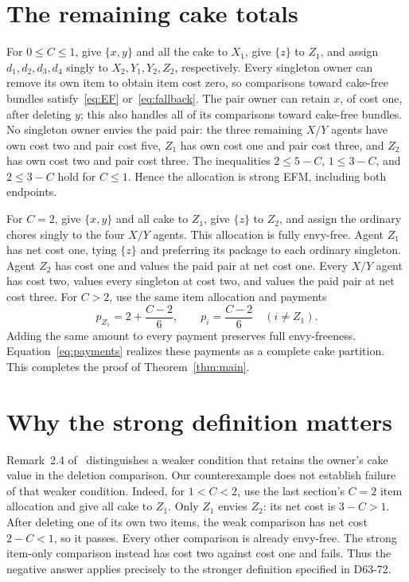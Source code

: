 \documentclass[11pt,a4paper]{article}
\begin{document}
\section{The remaining cake totals}

For $0\leq C\leq1$, give $\{x,y\}$ and all the cake to $X_1$, give
$\{z\}$ to $Z_1$, and assign $d_1,d_2,d_3,d_4$ singly to
$X_2,Y_1,Y_2,Z_2$, respectively. Every singleton owner can remove its
own item to obtain item cost zero, so comparisons toward cake-free
bundles satisfy~\eqref{eq:EF} or~\eqref{eq:fallback}.
The pair owner can retain $x$, of cost one, after deleting $y$;
this also handles all of its comparisons toward cake-free bundles.
No singleton owner envies the paid pair: the three remaining $X/Y$
agents have own cost two and pair cost five, $Z_1$ has own cost one
and pair cost three, and $Z_2$ has own cost two and pair cost three.
The inequalities $2\leq5-C$, $1\leq3-C$, and $2\leq3-C$ hold for
$C\leq1$. Hence the allocation is strong EFM, including both endpoints.

For $C=2$, give $\{x,y\}$ and all cake to $Z_1$, give $\{z\}$ to
$Z_2$, and assign the ordinary chores singly to the four $X/Y$ agents.
This allocation is fully envy-free. Agent $Z_1$ has net cost one,
tying $\{z\}$ and preferring its package to each ordinary singleton.
Agent $Z_2$ has cost one and values the paid pair at net cost one.
Every $X/Y$ agent has cost two, values every singleton at cost two,
and values the paid pair at net cost three.
For $C>2$, use the same item allocation and payments
\[
 p_{Z_1}=2+\frac{C-2}{6},\qquad
 p_i=\frac{C-2}{6}\quad(i\ne Z_1).
\]
Adding the same amount to every payment preserves full envy-freeness.
Equation~\eqref{eq:payments} realizes these payments as a complete
cake partition. This completes the proof of Theorem~\ref{thm:main}.

\section{Why the strong definition matters}

Remark~2.4 of~\cite{ALMS} distinguishes a weaker condition that retains
the owner's cake value in the deletion comparison. Our counterexample
does not establish failure of that weaker condition. Indeed, for
$1<C<2$, use the last section's $C=2$ item allocation and give all cake
to $Z_1$. Only $Z_1$ envies $Z_2$: its net cost is $3-C>1$.
After deleting one of its own two items, the weak comparison has net
cost $2-C<1$, so it passes. Every other comparison is already envy-free.
The strong item-only comparison instead has cost two against cost one
and fails. Thus the negative answer applies precisely to the stronger
definition specified in D63-72.
\end{document}
